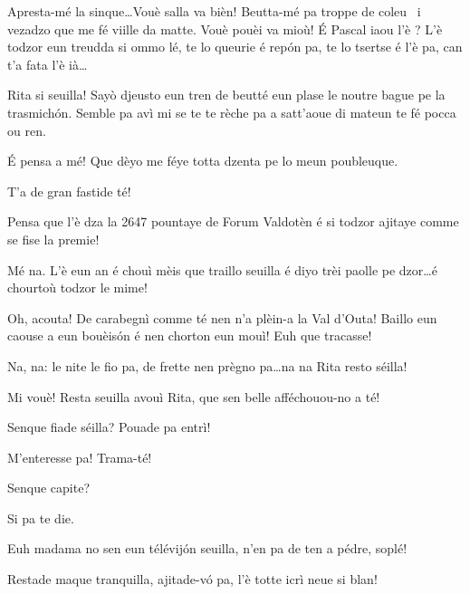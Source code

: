 \begin{drama}
\Ritaspeaks {} Apresta-mé la sinque\ldots Vouè salla va bièn!  Beutta-mé pa troppe de coleu \trucco\ i vezadzo que me fé viille da matte. Vouè pouèi va mioù! É Pascal iaou l’è ? L’è todzor eun treudda si ommo lé, te lo queurie é repón pa, te lo tsertse é l’è pa, can t’a fata l’è ià\ldots

\Pascalspeaks Rita si seuilla! Sayò djeusto eun tren de beutté eun plase le noutre bague pe la trasmichón. Semble pa avì mi se te te rèche pa a satt'aoue di mateun te fé pocca ou ren.

\Ritaspeaks É pensa a mé! Que dèyo me féye totta dzenta pe lo meun poubleuque.

\Pascalspeaks T’a de gran fastide té!

\Ritaspeaks Pensa que l’è dza la 2647 pountaye de Forum Valdotèn é si todzor ajitaye comme se fise la premie!

\Pascalspeaks Mé na. L’è eun an é chouì mèis que traillo seuilla é diyo trèi paolle pe dzor\ldots é chourtoù todzor le mime!

\Ritaspeaks Oh, acouta! De carabegnì comme té nen n'a plèin-a la Val d’Outa! Baillo eun caouse a eun bouèis\'on é nen chorton eun mouì! Euh que tracasse!

\Pascalspeaks Na, na: le nite le fio pa, de frette nen prègno pa\ldots na na Rita resto séilla!

\Ritaspeaks Mi vouè!  Resta seuilla avouì Rita, que sen belle afféchouou-no a té!


\Pascalspeaks Senque fiade séilla? Pouade pa entrì!

\Eumprezeospeaks M’enteresse pa! Trama-té!

\Ritaspeaks Senque capite? 


\Pascalspeaks Si pa te die.

\Ritaspeaks {} Euh madama no sen eun télévijón seuilla, n'en pa de ten a pédre, soplé!

\Eumprezeospeaks Restade maque tranquilla, ajitade-v\'o pa, l’è totte icrì neue si blan!



\end{drama}
